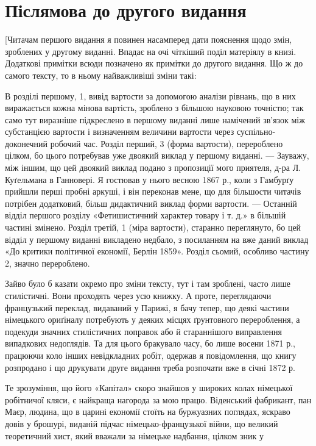 
\section*{Післямова до другого видання}

[Читачам першого видання я повинен насамперед дати пояснення
щодо змін, зроблених у другому виданні. Впадає на очі
чіткіший поділ матеріялу в книзі. Додаткові примітки всюди
позначено як примітки до другого видання. Що ж до самого тексту,
то в ньому найважливіші зміни такі:

В розділі першому, 1, вивід вартости за допомогою аналізи
рівнань, що в них виражається кожна мінова вартість, зроблено
з більшою науковою точністю; так само тут виразніше підкреслено
в першому виданні лише намічений зв’язок між субстанцією
вартости і визначенням величини вартости через суспільно-доконечний
робочий час. Розділ перший, 3 (форма вартости), перероблено
цілком, бо цього потребував уже двоякий виклад у
першому виданні. — Зауважу, між іншим, що цей двоякий виклад
подано з пропозиції мого приятеля, д-ра Л. Куґельмана в Ганновері.
Я гостював у нього весною 1867 р., коли з Гамбурґу
прийшли перші пробні аркуші, і він переконав мене, що для більшости
читачів потрібен додатковий, більш дидактичний виклад
форми вартости. — Останній відділ першого розділу «Фетишистичний
характер товару і т. д.» в більшій частині змінено. Розділ
третій, 1 (міра вартости), старанно переглянуто, бо цей відділ
у першому виданні викладено недбало, з посиланням на вже даний
виклад «До критики політичної економії, Берлін 1859». Розділ
сьомий, особливо частину 2, значно перероблено.

Зайво було б казати окремо про зміни тексту, тут і там зроблені,
часто лише стилістичні. Вони проходять через усю книжку.
А проте, переглядаючи французький переклад, видаваний у Парижі,
я бачу тепер, що деякі частини німецького ориґіналу потребують
у деяких місцях ґрунтовного перероблення, а подекуди
значних стилістичних поправок або й стараннішого виправлення
випадкових недоглядів. Та для цього бракувало часу, бо лише
восени 1871 р., працюючи коло інших невідкладних робіт, одержав
я повідомлення, що книгу розпродано і що друкувати друге
видання треба розпочати вже в січні 1872 р.

Те зрозуміння, що його «Капітал» скоро знайшов у широких
колах німецької робітничої кляси, є найкраща нагорода за мою
працю. Віденський фабрикант, пан Маєр, людина, що в царині
економії стоїть на буржуазних поглядах, яскраво довів у брошурі,
виданій підчас німецько-французької війни, що великий теоретичний
хист, який вважали за німецьке надбання, цілком зник у
\parbreak{}  %
